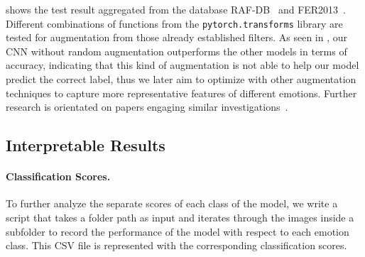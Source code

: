  shows the test result aggregated from the database RAF-DB~\cite{kaggle_rafdb} and FER2013~\cite{kaggle_fer}.
Different combinations of functions from the \texttt{pytorch.transforms} library are tested for augmentation from those already established filters. %
As seen in , 
our CNN without random augmentation outperforms the other models in terms of accuracy, 
indicating that this kind of augmentation is not able to help our model predict the correct label, 
thus we later aim to optimize with other augmentation techniques to capture more representative features of different emotions.
Further research is orientated on papers engaging similar investigations~\cite{ZeilerF14,li_reliable_2017,VermaMRMV23}.


\subsection{Interpretable Results}
\label{sec:evaluation:inter}

\paragraph{Classification Scores.}
To further analyze the separate scores of each class of the model, 
we write a script that takes a folder path as input and iterates through the images inside a subfolder to record the performance of the model with respect to each emotion class. 
This CSV file is represented with the corresponding classification scores. 

